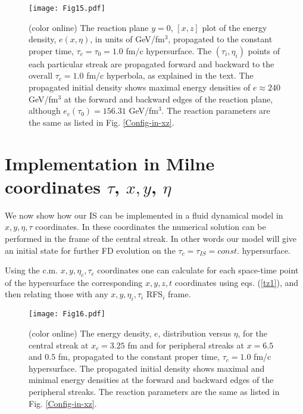 \documentclass[aps,prc,twocolumn,floatfix,showpacs,a4paper,
nofootinbib,amsmath,amssymb]{revtex4-1}
\begin{document}
\begin{figure}[htb]     %
\begin{center}
\resizebox{1.01\columnwidth}{!}
{\texttt{[image: Fig15.pdf]}}
\caption{ (color online)
The reaction plane $y=0$, $[x,z]$  plot of the energy density,
$e(x,\eta)$, in units of GeV/fm$^3$,
propagated to the constant proper time, $\tau_c=\tau_0 = 1.0$ fm/c 
hypersurface. The $(\tau_i,\eta_i)$ points of each particular streak are propagated forward and backward to the overall  $\tau_{c} = 1.0$ fm/c hyperbola, as explained in the text.
The propagated initial density shows maximal
energy densities of $e \approx 240$ GeV/fm$^3$ at the 
forward and backward edges of the reaction plane, although $e_c(\tau_0) = 156.31$ GeV/fm$^3$.
The reaction parameters are the same as 
listed in Fig. \ref{Config-in-xz}.
}
\label{Tauf-e-ex}
\end{center}
\end{figure}        %





\section{Implementation in Milne coordinates
{\Large $\tau$}, {\large $x, y$}, {\Large $\eta$} }\label{Milne}


We now show how our IS can be implemented in a fluid dynamical model in
$x,y,\eta,\tau$ coordinates.  
In these coordinates the numerical solution can be performed
in the frame of the central streak. In other words our model will give an initial state for further FD evolution on the  $\tau_c=\tau_{IS}=const.$ hypersurface. 


Using the c.m. $x,y,\eta_c,\tau_c$ coordinates one can calculate for each
space-time point of the hypersurface the corresponding $x,y,z,t$ coordinates using eqs. (\ref{tz1}), and then relating those with any $x,y,\eta_i,\tau_i$ RFS$_i$ frame. 






\begin{figure}[htb]     %
\begin{center}
\resizebox{1.01\columnwidth}{!}
{\texttt{[image: Fig16.pdf]}}
\caption{ (color online)
The energy density, $e$, distribution versus $\eta$,
for the central streak at $x_c = 3.25$ fm and for 
peripheral streaks at  $x = 6.5$ and $0.5$ fm,
propagated to the constant proper time, $\tau_{c} = 1.0$ fm/c 
hypersurface. The propagated initial density shows maximal and minimal
energy densities at the forward and backward edges of the
peripheral streaks.
The reaction parameters are the same as 
listed in Fig. \ref{Config-in-xz}.
}
\label{Tauf-e-e}
\end{center}
\end{figure}        %
\end{document}

